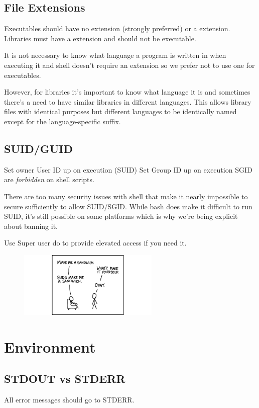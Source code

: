 \documentclass{article}
\begin{document}
\subsection{File Extensions}\label{subsec:file_ext}
Executables should have no extension (strongly preferred) or a  extension. Libraries must have a  extension and should not be executable.

It is not necessary to know what language a program is written in when executing it and shell doesn’t require an extension so we prefer not to use one for executables.

However, for libraries it’s important to know what language it is and sometimes there’s a need to have similar libraries in different languages. This allows library files with identical purposes but different languages to be identically named except for the language-specific suffix.

\subsection{SUID/GUID}\label{subsec:SUID}
 Set owner User ID up on execution (SUID) Set Group ID up on execution SGID are \emph{forbidden} on shell scripts.

There are too many security issues with shell that make it nearly impossible to secure sufficiently to allow SUID/SGID. While bash does make it difficult to run SUID, it’s still possible on some platforms which is why we’re being explicit about banning it.

Use Super user do  to provide elevated access if you need it.

\begin{figure}[H]
    \centering
    \includegraphics[width=0.6\textwidth]{sandwich.png}
\end{figure}

\section{Environment}\label{sec:env}
\subsection{STDOUT vs STDERR}\label{subsec:STD}
All error messages should go to STDERR.
\end{document}
